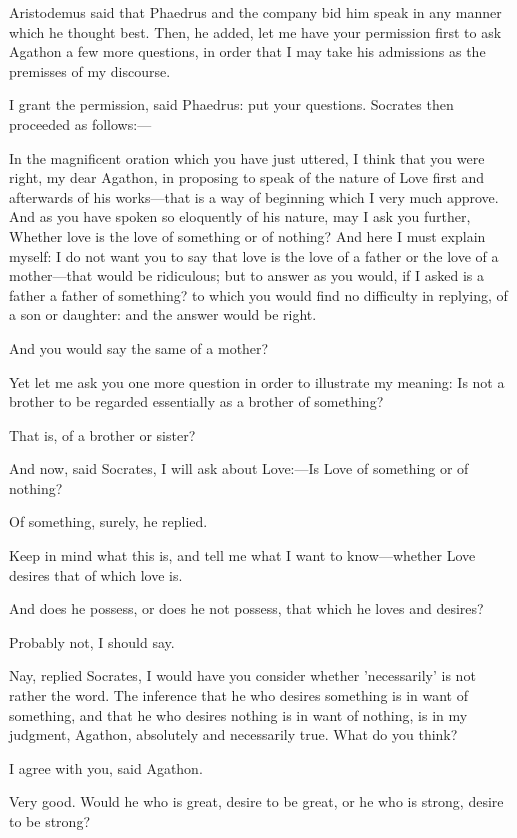 \para[82] Aristodemus said that Phaedrus and the company bid him speak in any manner which he thought best. Then, he added, let me have your permission first to ask Agathon a few more questions, in order that I may take his admissions as the premisses of my discourse.

\para[83] I grant the permission, said Phaedrus: put your questions. Socrates then proceeded as follows:---

\para[84] In the magnificent oration which you have just uttered, I think that you were right, my dear Agathon, in proposing to speak of the nature of Love first and afterwards of his works---that is a way of beginning which I very much approve. And as you have spoken so eloquently of his nature, may I ask you further, Whether love is the love of something or of nothing? And here I must explain myself: I do not want you to say that love is the love of a father or the love of a mother---that would be ridiculous; but to answer as you would, if I asked is a father a father of something? to which you would find no difficulty in replying, of a son or daughter: and the answer would be right.

\para[85] And you would say the same of a mother?

\para[86] Yet let me ask you one more question in order to illustrate my meaning: Is not a brother to be regarded essentially as a brother of something?

\para[87] That is, of a brother or sister?

\para[88] And now, said Socrates, I will ask about Love:---Is Love of something or of nothing?

\para[89] Of something, surely, he replied.

\para[90] Keep in mind what this is, and tell me what I want to know---whether Love desires that of which love is.

\para[91] And does he possess, or does he not possess, that which he loves and desires?

\para[92] Probably not, I should say.

\para[93] Nay, replied Socrates, I would have you consider whether 'necessarily' is not rather the word. The inference that he who desires something is in want of something, and that he who desires nothing is in want of nothing, is in my judgment, Agathon, absolutely and necessarily true. What do you think?

\para[94] I agree with you, said Agathon.

\para[95] Very good. Would he who is great, desire to be great, or he who is strong, desire to be strong?

